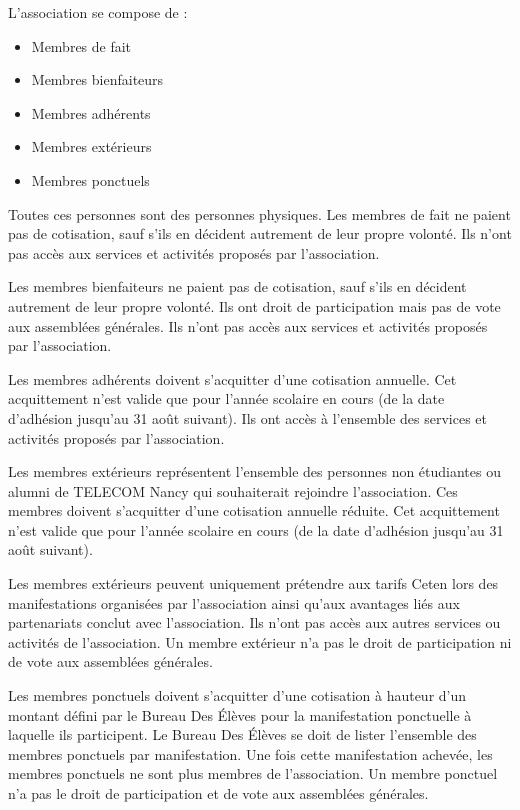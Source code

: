 \documentclass{article} %
\begin{document}
			L’association se compose de :
			\begin{itemize}
				\item Membres de fait
				\item Membres bienfaiteurs
				\item Membres adhérents
				\item Membres extérieurs
				\item Membres ponctuels
			\end{itemize}

			Toutes ces personnes sont des personnes physiques. Les membres de
			fait ne paient pas de cotisation, sauf s’ils en décident autrement
			de leur propre volonté. Ils n’ont pas accès aux services et
			activités proposés par l’association.

			Les membres bienfaiteurs ne paient pas de cotisation, sauf s’ils en
			décident autrement de leur propre volonté. Ils ont droit de
			participation mais pas de vote aux assemblées générales. Ils n’ont
			pas accès aux services et activités proposés par l’association.

			Les membres adhérents doivent s’acquitter d’une cotisation annuelle.
			Cet acquittement n’est valide que pour l’année scolaire en cours
			(de la date d’adhésion jusqu’au 31 août suivant). Ils ont accès à
			l’ensemble des services et activités proposés par l’association.

			Les membres extérieurs représentent l’ensemble des personnes non
			étudiantes ou alumni de TELECOM Nancy qui souhaiterait rejoindre
			l’association. Ces membres doivent s’acquitter d’une cotisation
			annuelle réduite. Cet acquittement n’est valide que pour l’année
			scolaire en cours (de la date d’adhésion jusqu’au 31 août suivant).

			Les membres extérieurs peuvent uniquement prétendre aux tarifs Ceten
			lors des manifestations organisées par l’association ainsi qu’aux
			avantages liés aux partenariats conclut avec l’association. Ils
			n’ont pas accès aux autres services ou activités de l’association.
			Un membre extérieur n’a pas le droit de participation ni de vote aux
			assemblées générales.

			Les membres ponctuels doivent s’acquitter d’une cotisation à hauteur
			d’un montant défini par le Bureau Des Élèves pour la manifestation
			ponctuelle à laquelle ils participent. Le Bureau Des Élèves se doit
			de lister l’ensemble des membres ponctuels par manifestation. Une
			fois cette manifestation achevée, les membres ponctuels ne sont plus
			membres de l’association. Un membre ponctuel n’a pas le droit de
			participation et de vote aux assemblées générales.
\end{document}
